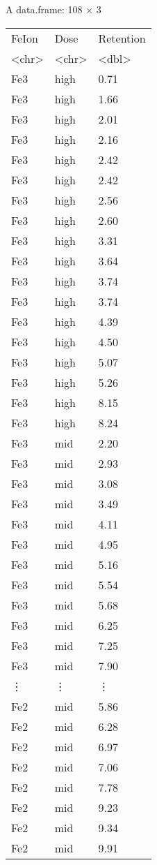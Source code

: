 \documentclass[11pt]{article}
\begin{document}
    A data.frame: 108 × 3
\begin{tabular}{lll}
 FeIon & Dose & Retention\\
 <chr> & <chr> & <dbl>\\
\hline
	 Fe3 & high & 0.71\\
	 Fe3 & high & 1.66\\
	 Fe3 & high & 2.01\\
	 Fe3 & high & 2.16\\
	 Fe3 & high & 2.42\\
	 Fe3 & high & 2.42\\
	 Fe3 & high & 2.56\\
	 Fe3 & high & 2.60\\
	 Fe3 & high & 3.31\\
	 Fe3 & high & 3.64\\
	 Fe3 & high & 3.74\\
	 Fe3 & high & 3.74\\
	 Fe3 & high & 4.39\\
	 Fe3 & high & 4.50\\
	 Fe3 & high & 5.07\\
	 Fe3 & high & 5.26\\
	 Fe3 & high & 8.15\\
	 Fe3 & high & 8.24\\
	 Fe3 & mid  & 2.20\\
	 Fe3 & mid  & 2.93\\
	 Fe3 & mid  & 3.08\\
	 Fe3 & mid  & 3.49\\
	 Fe3 & mid  & 4.11\\
	 Fe3 & mid  & 4.95\\
	 Fe3 & mid  & 5.16\\
	 Fe3 & mid  & 5.54\\
	 Fe3 & mid  & 5.68\\
	 Fe3 & mid  & 6.25\\
	 Fe3 & mid  & 7.25\\
	 Fe3 & mid  & 7.90\\
	 ⋮ & ⋮ & ⋮\\
	 Fe2 & mid &  5.86\\
	 Fe2 & mid &  6.28\\
	 Fe2 & mid &  6.97\\
	 Fe2 & mid &  7.06\\
	 Fe2 & mid &  7.78\\
	 Fe2 & mid &  9.23\\
	 Fe2 & mid &  9.34\\
	 Fe2 & mid &  9.91\\

\end{tabular}
\end{document}
